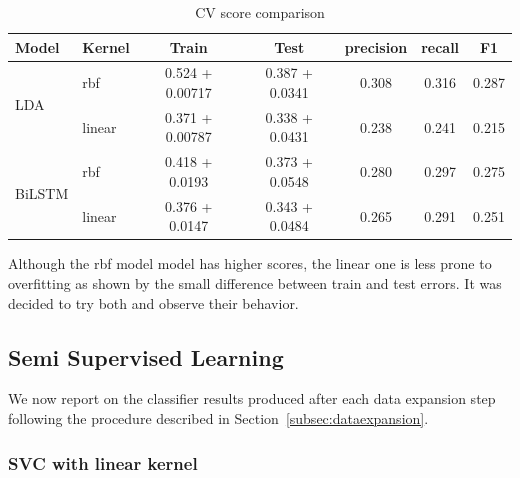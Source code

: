 \documentclass[11pt]{article}
\begin{document}

\begin{table}[htb]
\begin{center}
\begin{tabular}{ |p{1.5cm}|p{1cm}|c|c|c|c|c| }
\hline
Model 	& Kernel 	& Train & Test & precision & recall & F1 \\ \hline
\multirow{2}{*}{LDA} &	rbf		& 0.524 + 0.00717 & 0.387 + 0.0341 & 0.308 & 0.316 & 0.287 \\ 
& linear	& 0.371 + 0.00787 & 0.338 + 0.0431 & 0.238 & 0.241 & 0.215 \\ \hline
\multirow{2}{*}{BiLSTM}&	rbf		& 0.418 + 0.0193 & 0.373 + 0.0548 & 0.280 & 0.297 & 0.275 \\ 
& linear	& 0.376 + 0.0147 & 0.343 + 0.0484 & 0.265 & 0.291 & 0.251 \\ \hline
\end{tabular}
\caption{CV score comparison} \label{tab:classificationresults}
\end{center}
\end{table}
\FloatBarrier


Although the rbf model model has higher scores, the linear one is less prone to overfitting as shown by the small difference between train and test errors. It was decided to try both and observe their behavior.


\subsection{Semi Supervised Learning}
\label{subsec:semisupervised}

We now report on the classifier results produced after each data
expansion step following the procedure described in
Section~\ref{subsec:dataexpansion}.



  
\subsubsection{SVC with linear kernel}
\end{document}
